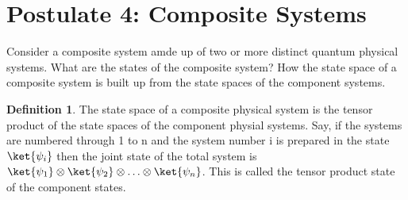 \documentclass[12pt, oneside]{book}
\theoremstyle{definition}
\newtheorem{definition}{Definition}[section]
\theoremstyle{definition}
\theoremstyle{remark}
\begin{document}
\section{Postulate 4: Composite Systems}
Consider a composite system amde up of two or more distinct quantum physical systems.
What are the states of the composite system? How the state space of a composite system is built up from the state spaces of the component 
systems.
\begin{definition}
    The state space of a composite physical system is the tensor product of the state spaces of the component physial systems. Say, 
    if the systems are numbered through 1 to n and the system number i is prepared in the state $\ket{\psi_i}$ then the joint
    state of the total system is $\ket{\psi_1}\otimes\ket{\psi_2}\otimes\ldots\otimes\ket{\psi_n}$. This is called the tensor product state of the component states.    
\end{definition}
\end{document}
